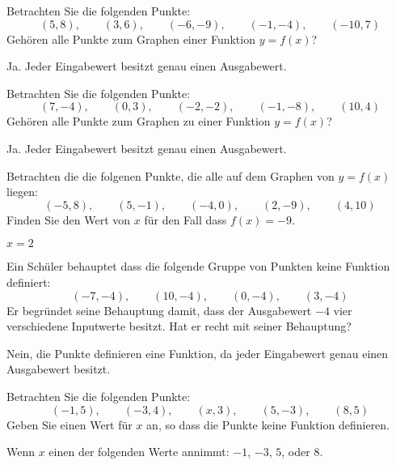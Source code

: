 \begin{exercises}
\begin{exercise} Betrachten Sie die folgenden Punkte:
\[
(5,8),\qquad (3,6), \qquad(-6,-9), \qquad(-1,-4), \qquad(-10,7)
\]
Gehören alle Punkte zum Graphen einer Funktion $y =f(x)$?
\begin{answer}
Ja. Jeder Eingabewert besitzt genau einen Ausgabewert.
\end{answer}
\end{exercise}


\begin{exercise} Betrachten Sie die folgenden Punkte:
\[
(7,-4),\qquad (0,3), \qquad(-2,-2), \qquad(-1,-8), \qquad(10,4)
\]
Gehören alle Punkte zum Graphen zu einer Funktion $y =f(x)$?
\begin{answer}
Ja. Jeder Eingabewert besitzt genau einen Ausgabewert.
\end{answer}
\end{exercise}


\begin{exercise} Betrachten die die folgenen Punkte, die alle auf dem Graphen von $y =f(x)$ liegen:
\[
(-5,8),\qquad (5,-1), \qquad(-4,0), \qquad(2,-9), \qquad(4,10)
\]
Finden Sie den Wert von $x$ für den Fall dass $f(x)=-9$.
\begin{answer}
$x=2$
\end{answer}
\end{exercise}

\begin{exercise} Ein Schüler behauptet dass die folgende Gruppe von Punkten keine Funktion definiert:
\[
(-7,-4),\qquad (10,-4), \qquad(0,-4), \qquad(3,-4)
\]
Er begründet seine Behauptung damit, dass der Ausgabewert $-4$ vier verschiedene Inputwerte besitzt. Hat er recht mit seiner Behauptung?

\begin{answer}
Nein, die Punkte definieren eine Funktion, da jeder Eingabewert genau einen Ausgabewert besitzt.
\end{answer}
\end{exercise}

\begin{exercise} Betrachten Sie die folgenden Punkte:
\[
(-1,5),\qquad (-3,4), \qquad(x,3), \qquad(5,-3), \qquad(8,5)
\]
Geben Sie einen Wert für $x$ an, so dass die Punkte keine Funktion definieren.
\begin{answer}
Wenn $x$ einen der folgenden Werte annimmt: $-1$, $-3$, $5$, oder $8$.
\end{answer}
\end{exercise}


\end{exercises}
